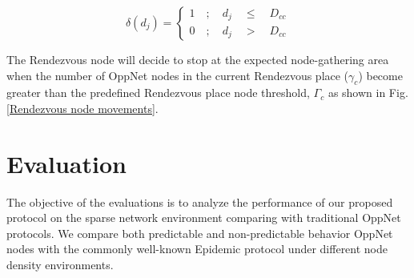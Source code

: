 \documentclass[conference]{IEEEtran}
\begin{document}
\[\delta \left( { d }_{ j } \right) =\begin{cases} 1\quad ;\quad { d }_{ j }\quad \le { \quad D }_{ cc } \\ 0\quad ;\quad { d }_{ j }\quad >{ \quad D }_{ cc } \end{cases}  \] 

The Rendezvous node will decide to stop at the expected node-gathering area when the number of OppNet nodes in the current Rendezvous place ($\gamma_{c}$) become greater than the predefined Rendezvous place node threshold, $\Gamma_{c}$ as shown in Fig. \ref{Rendezvous node movements}.  

\section{Evaluation}
The objective of the evaluations is to analyze the performance of our proposed protocol on the sparse network environment comparing with traditional OppNet protocols.
We compare both predictable and non-predictable behavior OppNet nodes with the commonly well-known Epidemic protocol\cite{Vahdat2000} under different node density environments.

\end{document}
